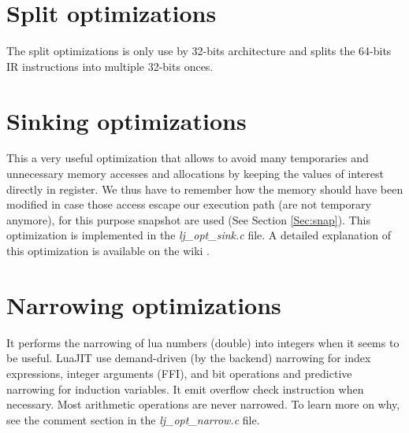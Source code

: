 
\section{Split optimizations}
\label{Sec:opt-split}

The split optimizations is only use by 32-bits architecture and splits the
64-bits IR instructions into multiple 32-bits onces.


\section{Sinking optimizations}
\label{Sec:opt-sinking}
This a very useful optimization that allows to avoid many temporaries and
unnecessary memory accesses and allocations by keeping the values of interest
directly in register. We thus have to remember how the memory should have been
modified in case those access escape our execution path (are not temporary
anymore), for this purpose snapshot are used (See Section \ref{Sec:snap}). This
optimization is implemented in the \emph{lj\_opt\_sink.c} file. A detailed
explanation of this optimization is available on the wiki \cite{luajit-sink}.


\section{Narrowing optimizations}
\label{Sec:narrowing}

It performs the narrowing of lua numbers (double) into integers when it seems
to be useful. LuaJIT use demand-driven (by the backend) narrowing for index
expressions, integer arguments (FFI), and bit operations and predictive
narrowing for induction variables. It emit overflow check instruction when
necessary. Most arithmetic operations are never narrowed. To learn more on why,
see the comment section in the \emph{lj\_opt\_narrow.c} file.

